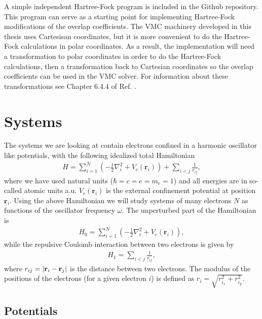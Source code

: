 \documentclass[../main.tex]{subfiles}
\begin{document}
A simple independent Hartree-Fock program is included in the Github repository\cite{github}. This program can serve as a starting point for implementing Hartree-Fock modifications of the overlap coefficients. The VMC machinery developed in this thesis uses Cartesisan coordinates, but it is more convenient to do the Hartree-Fock calculations in polar coordinates. As a result, the implementation will need a transformation to polar coordinates in order to do the Hartree-Fock calculations, then a transformation back to Cartesian coordinates so the overlap coefficients can be used in the VMC solver. For information about these transformations see Chapter 6.4.4 of Ref. \cite{Yang}.


\chapter{Systems}

The systems we are looking at contain electrons confined in a harmonic oscillator like potentials, with the following idealized total Hamiltonian
\begin{align}\label{eq: finalH}
    H=\sum_{i=1}^{N} \left(  -\frac{1}{2} \nabla_i^2 + V_c(\mathbf{r}_i)  \right)+\sum_{i<j}\frac{1}{r_{ij}},
\end{align}
where we have used natural units ($\hbar=c=e=m_e=1$) and all energies are in so-called atomic units a.u. $V_c(\mathbf{r}_i)$ is the external confinement potential at position $\mathbf{r}_i$. Using the above Hamiltonian we will study systems of many electrons $N$ as functions of the oscillator frequency  $\omega$. The unperturbed part of the Hamiltonian is
\begin{align}
    H_0=\sum_{i=1}^{N} \left(  -\frac{1}{2} \nabla_i^2 + V_c(\mathbf{r}_i)  \right),
\end{align}
while the repulsive Coulomb interaction between two electrons is given by
\begin{align}
    H_1=\sum_{i<j}\frac{1}{r_{ij}},
\end{align}
where $r_{ij}=\vert {\bf r}_i-{\bf r}_j\vert$ is the distance between two electrons. The modulus of the positions of the electrons (for a given electron $i$) is defined as $r_i = \sqrt{r_{i_x}^2+r_{i_y}^2}$.



\section{Potentials}
\end{document}

